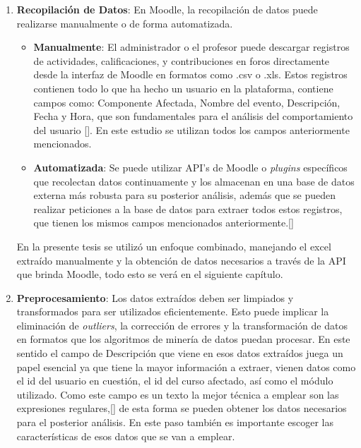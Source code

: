 \begin{enumerate}
    \item \textbf{Recopilación de Datos}: En Moodle, la recopilación de datos puede realizarse manualmente o de forma automatizada.  
        \begin{itemize}
            \item \textbf{Manualmente}: El administrador o el profesor puede descargar registros de actividades, calificaciones, y contribuciones en foros directamente desde la interfaz de Moodle en formatos como .csv o .xls. Estos registros contienen todo lo que ha hecho un usuario en la plataforma, contiene campos como: Componente Afectada, Nombre del evento, Descripción, Fecha y Hora, que son fundamentales para el análisis del comportamiento del usuario [\cite{Sarria_tesis}]. En este estudio se utilizan todos los campos anteriormente mencionados.  
            \item \textbf{Automatizada}: Se puede utilizar API's de Moodle o \textit{plugins} específicos que recolectan datos continuamente y los almacenan en una base de datos externa más robusta para su posterior análisis, además que se pueden realizar peticiones a la base de datos para extraer todos estos registros, que tienen los mismos campos mencionados anteriormente.[\cite{Romero_tesis}]
        \end{itemize}
    En la presente tesis se utilizó un enfoque combinado, manejando el excel extraído manualmente y la obtención de datos necesarios a través de la API que brinda Moodle, todo esto se verá en el siguiente capítulo.  

    \item \textbf{Preprocesamiento}: Los datos extraídos deben ser limpiados y transformados para ser utilizados eficientemente. Esto puede implicar la eliminación de \textit{outliers}, la corrección de errores y la transformación de datos en formatos que los algoritmos de minería de datos puedan procesar. En este sentido el campo de Descripción que viene en esos datos extraídos juega un papel esencial ya que tiene la mayor información a extraer, vienen datos como el id del usuario en cuestión, el id del curso afectado, así como el módulo utilizado. Como este campo es un texto la mejor técnica a emplear son las expresiones regulares,[\cite{Sarria_tesis}] de esta forma se pueden obtener los datos necesarios para el posterior análisis. En este paso también es importante escoger las características de esos datos que se van a emplear.  
    

\end{enumerate}
